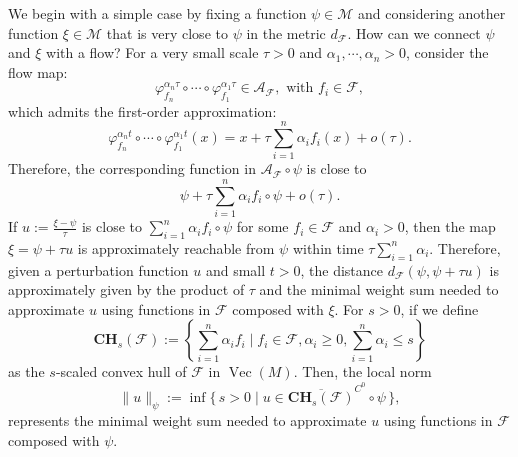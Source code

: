 \documentclass[12pt]{amsart}
\numberwithin{equation}{section}
\theoremstyle{remark}
\begin{document}
We begin with a simple case by fixing a function $\psi \in \mathcal M$ and considering another function $\xi \in \mathcal M$ that is very close to $\psi$ in the metric $d_{\mathcal F}$.
How can we connect $\psi$ and $\xi$ with a flow?
For a very small scale $\tau>0$ and $ \alpha_1, \cdots, \alpha_n>0$,
consider the flow map:
\begin{equation}
    \varphi_{f_n}^{\alpha_n \tau}\circ \cdots \circ \varphi_{f_1}^{\alpha_1 \tau} \in \mathcal A_{\mathcal F}, \text{ with } f_i \in \mathcal F,
\end{equation}
which admits the first-order approximation:
\begin{equation}
    \varphi_{f_n}^{\alpha_n t}\circ \cdots \circ \varphi_{f_1}^{\alpha_1 t}(x) = x + \tau \sum_{i=1}^n \alpha_i f_i(x) + o(\tau).
\end{equation}
Therefore, the corresponding function in $\mathcal A_{\mathcal F}\circ \psi$ is close to
\begin{equation}
    \psi + \tau \sum_{i=1}^n \alpha_i f_i\circ \psi + o(\tau).
\end{equation}
If $u:=\frac{\xi-\psi}{\tau}$ is close to $\sum_{i=1}^n \alpha_i f_i\circ \psi$ for some $f_i \in \mathcal F$ and $\alpha_i>0$, then the map $\xi = \psi +\tau u$ is approximately reachable from $\psi$ within time $\tau \sum_{i=1}^n \alpha_i$.
Therefore, given a perturbation function $u$ and small $t>0$, the distance $d_{\mathcal F}(\psi, \psi+\tau u)$ is approximately given by the product of $\tau$ and the minimal weight sum needed to approximate $u$ using functions in $\mathcal F$ composed with $\xi$. For $s>0$, if we define
\begin{equation}
    \mathbf{CH}_s(\mathcal F):=
    \left\{\sum_{i=1}^n \alpha_i f_i \mid f_i \in \mathcal F, \alpha_i\ge 0, \sum_{i=1}^n \alpha_i \le s
    \right\}
\end{equation}
as the $s$-scaled convex hull of $\mathcal F$ in $\operatorname{Vec}(M)$. 
Then, the local norm
\begin{equation}
    \label{eq:local_norm_relu}
    \|u\|_{\psi}:=\inf\{\,s>0\mid u\in \overline{\mathbf{CH}_s(\mathcal F)}^{C^0}\circ \psi\,\},
\end{equation}
represents the minimal weight sum needed to approximate $u$ using functions in $\mathcal F$ composed with $\psi$. 
\end{document}
